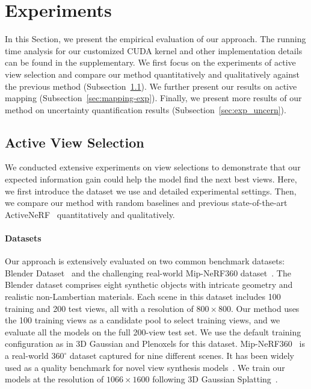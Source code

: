 \section{Experiments} \label{sec:exps}
In this Section, we present the empirical evaluation of our approach.
The running time analysis for our customized CUDA kernel and other implementation details can be found in the supplementary.
We first focus on the experiments of active view selection and compare our method quantitatively and qualitatively against the previous method (Subsection~\ref{sec:view-exp}).
We further present our results on active mapping (Subsection~\ref{sec:mapping-exp}).
Finally, we present more results of our method on uncertainty quantification results (Subsection~\ref{sec:exp_uncern}).

\subsection{Active View Selection}\label{sec:view-exp}
We conducted extensive experiments on view selections to demonstrate that our expected information gain could help the model find the next best views. Here, we first introduce the dataset we use and detailed experimental settings. Then, we compare our method with random baselines and previous state-of-the-art ActiveNeRF~\cite{pan2022activenerf} quantitatively and qualitatively.
\paragraph{Datasets} Our approach is extensively evaluated on two common benchmark datasets: Blender Dataset~\cite{mildenhall2020nerf} and the challenging real-world Mip-NeRF360 dataset~\cite{barron2022mipnerf360}. The Blender dataset comprises eight synthetic objects with intricate geometry and realistic non-Lambertian materials. Each scene in this dataset includes 100 training and 200 test views, all with a resolution of $800\times800$. Our method uses the 100 training views as a candidate pool to select training views, and we evaluate all the models on the full 200-view test set.
We use the default training configuration as in 3D Gaussian and Plenoxels for this dataset.
Mip-NeRF360~\cite{barron2022mipnerf360} is a real-world $360^\circ$ dataset captured for nine different scenes. It has been widely used as a quality benchmark for novel view synthesis models~\cite{barron2023zipnerf, multinerf2022}. We train our models at the resolution of $1066\times1600$ following 3D Gaussian Splatting~\cite{kerbl3Dgaussians}.
